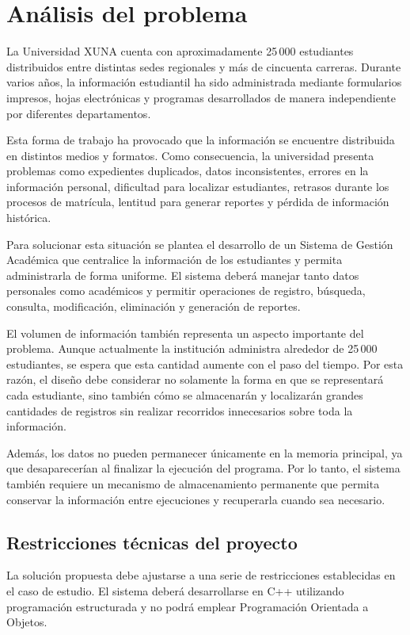 \section{Análisis del problema}

La Universidad XUNA cuenta con aproximadamente 25\,000 estudiantes
distribuidos entre distintas sedes regionales y más de cincuenta
carreras. Durante varios años, la información estudiantil ha sido
administrada mediante formularios impresos, hojas electrónicas y
programas desarrollados de manera independiente por diferentes
departamentos.

Esta forma de trabajo ha provocado que la información se encuentre
distribuida en distintos medios y formatos. Como consecuencia, la
universidad presenta problemas como expedientes duplicados, datos
inconsistentes, errores en la información personal, dificultad para
localizar estudiantes, retrasos durante los procesos de matrícula,
lentitud para generar reportes y pérdida de información histórica.

Para solucionar esta situación se plantea el desarrollo de un Sistema de
Gestión Académica que centralice la información de los estudiantes y
permita administrarla de forma uniforme. El sistema deberá manejar tanto
datos personales como académicos y permitir operaciones de registro,
búsqueda, consulta, modificación, eliminación y generación de reportes.

El volumen de información también representa un aspecto importante del
problema. Aunque actualmente la institución administra alrededor de
25\,000 estudiantes, se espera que esta cantidad aumente con el paso del
tiempo. Por esta razón, el diseño debe considerar no solamente la forma
en que se representará cada estudiante, sino también cómo se almacenarán
y localizarán grandes cantidades de registros sin realizar recorridos
innecesarios sobre toda la información.

Además, los datos no pueden permanecer únicamente en la memoria
principal, ya que desaparecerían al finalizar la ejecución del programa.
Por lo tanto, el sistema también requiere un mecanismo de almacenamiento
permanente que permita conservar la información entre ejecuciones y
recuperarla cuando sea necesario.

\subsection{Restricciones técnicas del proyecto}

La solución propuesta debe ajustarse a una serie de restricciones
establecidas en el caso de estudio. El sistema deberá desarrollarse en
C++ utilizando programación estructurada y no podrá emplear Programación
Orientada a Objetos.

